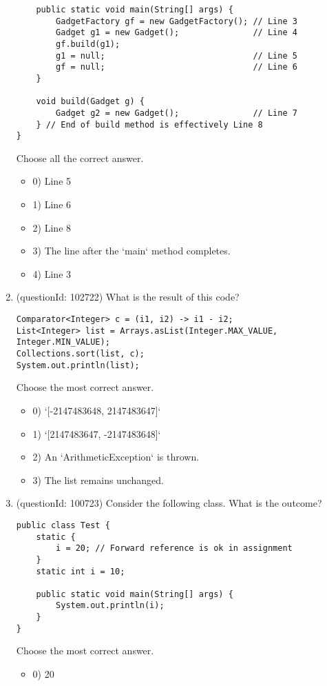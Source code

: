 \documentclass[12pt]{article}
\begin{document}
\begin{enumerate}[label=(\arabic*)]
\begin{verbatim}
    public static void main(String[] args) {
        GadgetFactory gf = new GadgetFactory(); // Line 3
        Gadget g1 = new Gadget();               // Line 4
        gf.build(g1);
        g1 = null;                              // Line 5
        gf = null;                              // Line 6
    }

    void build(Gadget g) {
        Gadget g2 = new Gadget();               // Line 7
    } // End of build method is effectively Line 8
}
\end{verbatim}
Choose all the correct answer.\begin{itemize}
\item 0) Line 5

\item 1) Line 6

\item 2) Line 8

\item 3) The line after the `main` method completes.

\item 4) Line 3

\end{itemize}
\item (questionId: 102722) What is the result of this code?
\begin{verbatim}
Comparator<Integer> c = (i1, i2) -> i1 - i2;
List<Integer> list = Arrays.asList(Integer.MAX_VALUE, Integer.MIN_VALUE);
Collections.sort(list, c);
System.out.println(list);
\end{verbatim}
Choose the most correct answer. 
\begin{itemize}
\item 0) `[-2147483648, 2147483647]`

\item 1) `[2147483647, -2147483648]`

\item 2) An `ArithmeticException` is thrown.

\item 3) The list remains unchanged.

\end{itemize}
\item (questionId: 100723) Consider the following class. What is the outcome?\n\begin{verbatim}
public class Test {
    static {
        i = 20; // Forward reference is ok in assignment
    }
    static int i = 10;

    public static void main(String[] args) {
        System.out.println(i);
    }
}
\end{verbatim}
Choose the most correct answer. 
\begin{itemize}
\item 0) 20


\end{itemize}
\end{enumerate}
\end{document}

